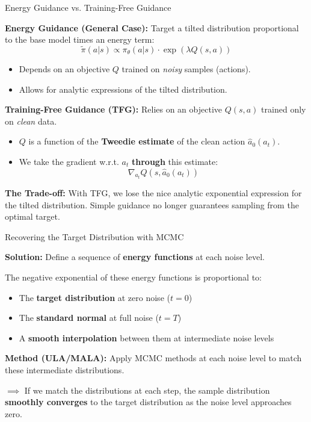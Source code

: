 \documentclass[aspectratio=169]{beamer}
\begin{document}
\begin{frame}{Energy Guidance vs. Training-Free Guidance}

\textbf{Energy Guidance (General Case):}
Target a tilted distribution proportional to the base model times an energy term:
\[ \tilde{\pi}(a|s) \propto \pi_\theta(a|s) \cdot \exp(\lambda Q(s, a)) \]
\begin{itemize}
    \item Depends on an objective $Q$ trained on \emph{noisy} samples (actions).
    \item Allows for analytic expressions of the tilted distribution.
\end{itemize}

\vspace{0.5em}
\textbf{Training-Free Guidance (TFG):}
Relies on an objective $Q(s, a)$ trained only on \emph{clean} data.
\begin{itemize}
    \item $Q$ is a function of the \textbf{Tweedie estimate} of the clean action $\hat{a}_0(a_t)$.
    \item We take the gradient w.r.t. $a_t$ \textbf{through} this estimate:
    \[ \nabla_{a_t} Q(s, \hat{a}_0(a_t)) \]
\end{itemize}

\vspace{0.5em}
\textbf{The Trade-off:} With TFG, we lose the nice analytic exponential expression for the tilted distribution. Simple guidance no longer guarantees sampling from the optimal target.

\end{frame}

\begin{frame}{Recovering the Target Distribution with MCMC}

\textbf{Solution:} Define a sequence of \textbf{energy functions} at each noise level.

\vspace{0.5em}
The negative exponential of these energy functions is proportional to:
\begin{itemize}
    \item The \textbf{target distribution} at zero noise ($t=0$)
    \item The \textbf{standard normal} at full noise ($t=T$)
    \item A \textbf{smooth interpolation} between them at intermediate noise levels
\end{itemize}

\vspace{0.5em}
\textbf{Method (ULA/MALA):}
Apply MCMC methods at each noise level to match these intermediate distributions.

\vspace{0.5em}
$\implies$ If we match the distributions at each step, the sample distribution \textbf{smoothly converges} to the target distribution as the noise level approaches zero.

\end{frame}
\end{document}
